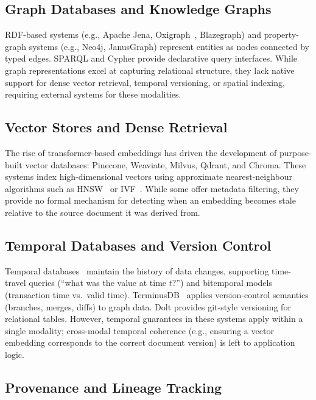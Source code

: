 \documentclass[11pt,twocolumn]{article}
\begin{document}
\subsection{Graph Databases and Knowledge Graphs}

RDF-based systems (e.g., Apache Jena, Oxigraph~\cite{oxigraph2023},
Blazegraph) and property-graph systems (e.g., Neo4j, JanusGraph) represent
entities as nodes connected by typed edges.  SPARQL and Cypher provide
declarative query interfaces.  While graph representations excel at capturing
relational structure, they lack native support for dense vector retrieval,
temporal versioning, or spatial indexing, requiring external systems for these
modalities.

\subsection{Vector Stores and Dense Retrieval}

The rise of transformer-based embeddings has driven the development of
purpose-built vector databases: Pinecone, Weaviate, Milvus, Qdrant, and
Chroma.  These systems index high-dimensional vectors using approximate
nearest-neighbour algorithms such as HNSW~\cite{malkov2018hnsw} or
IVF~\cite{jegou2011pq}.  While some offer metadata filtering, they provide
no formal mechanism for detecting when an embedding becomes stale relative
to the source document it was derived from.

\subsection{Temporal Databases and Version Control}

Temporal databases~\cite{snodgrass1999temporal} maintain the history of data
changes, supporting time-travel queries (``what was the value at time $t$?'')
and bitemporal models (transaction time vs.\ valid time).  TerminusDB~\cite{terminusdb2023}
applies version-control semantics (branches, merges, diffs) to graph data.
Dolt provides git-style versioning for relational tables.  However, temporal
guarantees in these systems apply within a single modality; cross-modal
temporal coherence (e.g., ensuring a vector embedding corresponds to the
correct document version) is left to application logic.

\subsection{Provenance and Lineage Tracking}
\end{document}
